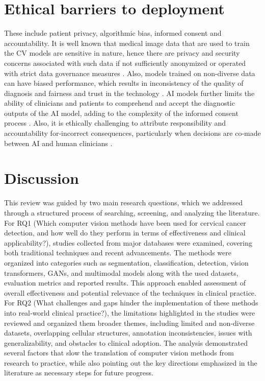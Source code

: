 \documentclass[final,5p,times,twocolumn,authoryear]{elsarticle}
\begin{document}
\section{Ethical barriers to deployment}
These include patient privacy, algorithmic bias, informed consent and accountability. It is well known that medical image data that are used to train the CV models are sensitive in nature, hence there are privacy and security concerns associated with such data if not sufficiently anonymized or operated with strict data governance measures \cite{ref124,ref125}. Also, models trained on non-diverse data can have biased performance, which results in inconsistency of the quality of diagnosis and fairness and trust in the technology \cite{ref150}.
AI models further limits the ability of clinicians and patients to comprehend and accept the diagnostic outputs of the AI model, adding to the complexity of the informed consent process \cite{ref6,ref7}. Also, it is ethically challenging to attribute responsibility and accountability for‑incorrect consequences, particularly when decisions are co‑made between AI and human clinicians \cite{ref151,ref152}.
\section{Discussion}
This review was guided by two main research questions, which we addressed through a structured process of searching, screening, and analyzing the literature. For RQ1 (Which computer vision methods have been used for cervical cancer detection, and how well do they perform in terms of effectiveness and clinical applicability?), studies collected from major databases were examined, covering both traditional techniques and recent advancements. The methods were organized into categories such as segmentation, classification, detection, vision transformers, GANs, and multimodal models along with the used datasets, evaluation metrics and reported results. This approach enabled assessment of overall effectiveness and potential relevance of the techniques in clinical practice.
For RQ2 (What challenges and gaps hinder the implementation of these methods into real‑world clinical practice?), the limitations highlighted in the studies were reviewed and organized them broader themes, including limited and non‑diverse datasets, overlapping cellular structures, annotation inconsistencies, issues with generalizability, and obstacles to clinical adoption. The analysis demonstrated several factors that slow the translation of computer vision methods from research to practice, while also pointing out the key directions emphasized in the literature as necessary steps for future progress.
\end{document}
